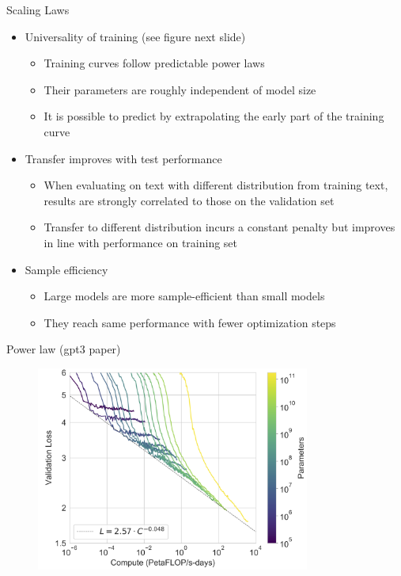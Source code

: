 \begin{vbframe}{Scaling Laws}

\vfill

\begin{itemize}

	\item Universality of training (see figure next
	slide) \qmark
	\begin{itemize}
	\item Training curves follow predictable power laws
	\item Their parameters are roughly independent of model size
	\item It is possible to predict by extrapolating the early part of the training curve
	\end{itemize}

	\item Transfer improves with test performance \qmark
	\begin{itemize}
	\item When evaluating on text with different distribution from training text, results are strongly correlated to those on the validation set
	\item Transfer to different distribution incurs a constant penalty but improves in line with performance on training set
	\end{itemize}

	\item Sample efficiency \qmark
	\begin{itemize}
	\item Large models are more sample-efficient than small models
	\item They reach same performance with fewer optimization steps
	\end{itemize}

\end{itemize}

\vfill

\end{vbframe}


\begin{vbframe}{Power law (gpt3 paper)}

\vfill

\begin{figure}
	\centering
	\includegraphics[width = 9cm]{./figure/losscompute}
\end{figure}

\vfill

\end{vbframe}


